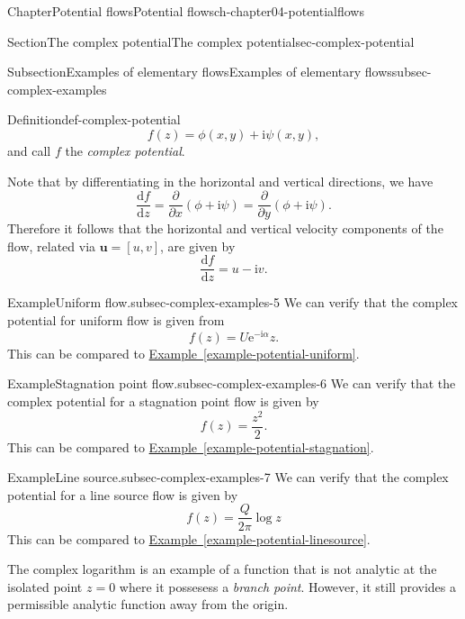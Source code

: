\documentclass[oneside,10pt,]{book}
\newcommand{\xreffont}{\relax}
\numberwithin{equation}{section}
\newcommand{\e}{\mathrm{e}}
\newcommand{\im}{\mathrm{i}}
\newcommand{\de}{\mathrm{d}}
\newcommand{\dd}[2]{\frac{\de#1}{\de#2}}
\newcommand{\pd}[2]{\frac{\partial#1}{\partial#2}}
\newcommand{\bu}{\boldsymbol{u}}
\begin{document}
\begin{chapterptx}{Chapter}{Potential flows}{}{Potential flows}{}{}{ch-chapter04-potentialflows}
\begin{sectionptx}{Section}{The complex potential}{}{The complex potential}{}{}{sec-complex-potential}
\begin{subsectionptx}{Subsection}{Examples of elementary flows}{}{Examples of elementary flows}{}{}{subsec-complex-examples}
\begin{definition}{Definition}{}{def-complex-potential}
\begin{equation}
f(z) = \phi(x, y) + \im \psi(x, y),\label{eqn-complex-potential}
\end{equation}
and call \(f\) the \emph{complex potential}.%
\par
Note that by differentiating in the horizontal and vertical directions, we have%
\begin{equation*}
\dd{f}{z} = \pd{}{x} (\phi + \im \psi) = \pd{}{y} (\phi + \im \psi). 
\end{equation*}
Therefore it follows that the horizontal and vertical velocity components of the flow, related via \(\bu = [u, v]\), are given by%
\begin{equation}
\dd{f}{z} = u - \im v.\label{eqn-complex-velocity}
\end{equation}
%
\end{definition}
\begin{example}{Example}{Uniform flow.}{subsec-complex-examples-5}%
%
We can verify that the complex potential for uniform flow is given from%
\begin{equation*}
f(z) = U \e^{-\im \alpha} z.
\end{equation*}
This can be compared to  \hyperref[example-potential-uniform]{Example~{\xreffont\ref{example-potential-uniform}}}.%
\end{example}
\begin{example}{Example}{Stagnation point flow.}{subsec-complex-examples-6}%
%
We can verify that the complex potential for a stagnation point flow is given by%
\begin{equation*}
f(z) = \frac{z^2}{2}.
\end{equation*}
This can be compared to  \hyperref[example-potential-stagnation]{Example~{\xreffont\ref{example-potential-stagnation}}}.%
\end{example}
\begin{example}{Example}{Line source.}{subsec-complex-examples-7}%
%
We can verify that the complex potential for a line source flow is given by%
\begin{equation}
f(z) = \frac{Q}{2\pi} \log z\label{eqn-complex-linesource}
\end{equation}
This can be compared to  \hyperref[example-potential-linesource]{Example~{\xreffont\ref{example-potential-linesource}}}.%
\par
The complex logarithm is an example of a function that is not analytic at the isolated point \(z = 0\) where it possesess a \emph{branch point}. However, it still provides a permissible analytic function away from the origin.%

\end{example}
\end{subsectionptx}
\end{sectionptx}
\end{chapterptx}
\end{document}
